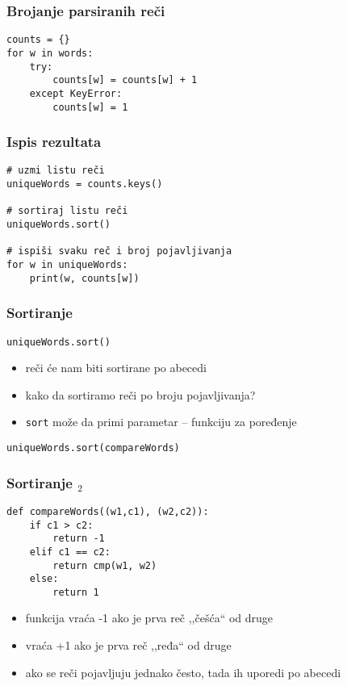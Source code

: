 \documentclass[utf8,compress,aspectratio=169]{beamer}
\begin{document}
\begin{frame}[fragile]
  \frametitle{Brojanje parsiranih reči}
\begin{verbatim}
counts = {}
for w in words:
    try:
        counts[w] = counts[w] + 1
    except KeyError:
        counts[w] = 1
\end{verbatim}
\end{frame}

\begin{frame}[fragile]
  \frametitle{Ispis rezultata}
\begin{verbatim}
# uzmi listu reči
uniqueWords = counts.keys()

# sortiraj listu reči
uniqueWords.sort()

# ispiši svaku reč i broj pojavljivanja
for w in uniqueWords:
    print(w, counts[w])
\end{verbatim}
\end{frame}

\begin{frame}[fragile]
  \frametitle{Sortiranje}
\begin{verbatim}
uniqueWords.sort()
\end{verbatim}
  \begin{itemize}
    \item reči će nam biti sortirane po abecedi
    \item kako da sortiramo reči po broju pojavljivanja?
    \item \texttt{sort} može da primi parametar -- funkciju za poređenje
  \end{itemize}
\begin{verbatim}
uniqueWords.sort(compareWords)
\end{verbatim}
\end{frame}

\begin{frame}[fragile]
  \frametitle{Sortiranje $_2$}
\begin{verbatim}
def compareWords((w1,c1), (w2,c2)):
    if c1 > c2:
        return -1
    elif c1 == c2:
        return cmp(w1, w2)
    else:
        return 1
\end{verbatim}
  \begin{itemize}
    \item funkcija vraća -1 ako je prva reč ,,češća`` od druge
    \item vraća +1 ako je prva reč ,,ređa`` od druge
    \item ako se reči pojavljuju jednako često, tada ih uporedi po abecedi
  \end{itemize}
\end{frame}
\end{document}
